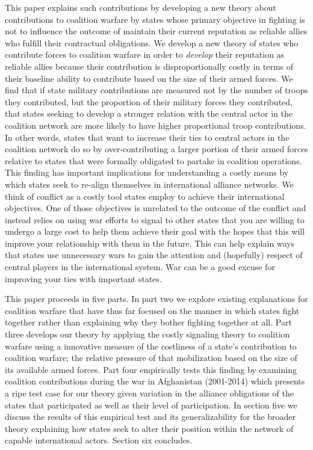 \documentclass[12pt,letterpaper]{article}
\begin{document}
	This paper explains such contributions by developing a new theory about contributions to coalition warfare by states whose primary objective in fighting is not to influence the outcome of maintain their current reputation as reliable allies who fulfill their contractual obligations. We develop a new theory of states who contribute forces to coalition warfare in order to \textit{develop} their reputation as reliable allies because their contribution is disproportionally costly in terms of their baseline ability to contribute based on the size of their armed forces. We find that if state military contributions are measured not by the number of troops they contributed, but the proportion of their military forces they contributed, that states seeking to develop a stronger relation with the central actor in the coalition network are more likely to have higher proportional troop contributions. In other words, states that want to increase their ties to central actors in the coalition network do so by over-contributing a larger portion of their armed forces relative to states that were formally obligated to partake in coalition operations. This finding has important implications for understanding a costly means by which states seek to re-align themselves in international alliance networks. We think of conflict as a costly tool states employ to achieve their international objectives. One of those objectives is unrelated to the outcome of the conflict and instead relies on using war efforts to signal to other states that you are willing to undergo a large cost to help them achieve their goal with the hopes that this will improve your relationship with them in the future. This can help explain ways that states use unnecessary wars to gain the attention and (hopefully) respect of central players in the international system. War can be a good excuse for improving your ties with important states.

	This paper proceeds in five parts. In part two we explore existing explanations for coalition warfare that have thus far focused on the manner in which states fight together rather than explaining why they bother fighting together at all. Part three develops our theory by applying the costly signaling theory to coalition warfare using a innovative measure of the costliness of a state's contribution to coalition warfare; the relative pressure of that mobilization based on the size of its available armed forces. Part four empirically tests this finding by examining coalition contributions during the war in Afghanistan (2001-2014) which presents a ripe test case for our theory given variation in the alliance obligations of the states that participated as well as their level of participation. In section five we discuss the results of this empirical test and its generalizability for the broader theory explaining how states seek to alter their position within the network of capable international actors. Section six concludes.
\end{document}
